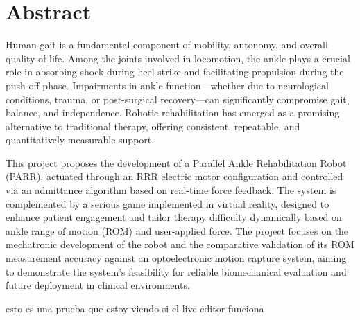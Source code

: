 
\section*{Abstract}
{}
\graphicspath{{images/}}


Human gait is a fundamental component of mobility, autonomy, and overall quality of life. Among the joints involved in locomotion, the ankle plays a crucial role in absorbing shock during heel strike and facilitating propulsion during the push-off phase. Impairments in ankle function—whether due to neurological conditions, trauma, or post-surgical recovery—can significantly compromise gait, balance, and independence. Robotic rehabilitation has emerged as a promising alternative to traditional therapy, offering consistent, repeatable, and quantitatively measurable support.

This project proposes the development of a Parallel Ankle Rehabilitation Robot (PARR), actuated through an RRR electric motor configuration and controlled via an admittance algorithm based on real-time force feedback. The system is complemented by a serious game implemented in virtual reality, designed to enhance patient engagement and tailor therapy difficulty dynamically based on ankle range of motion (ROM) and user-applied force. The project focuses on the mechatronic development of the robot and the comparative validation of its ROM measurement accuracy against an optoelectronic motion capture system, aiming to demonstrate the system’s feasibility for reliable biomechanical evaluation and future deployment in clinical environments.

esto es una prueba que estoy viendo si el live editor funciona

